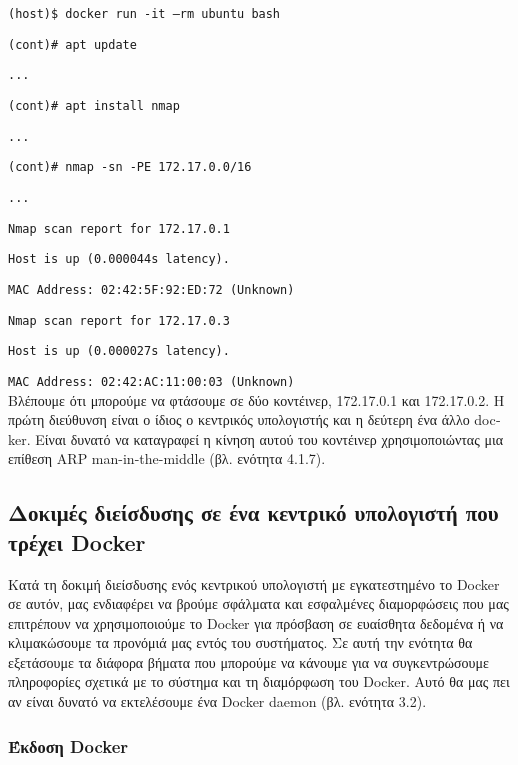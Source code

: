 \texttt{\textlatin{(host)\$ docker run -it --rm ubuntu bash}}

\texttt{\textlatin{(cont)\# apt update}}

\texttt{\textlatin{...}}

\texttt{\textlatin{(cont)\# apt install nmap}}

\texttt{\textlatin{...}}

\texttt{\textlatin{(cont)\# nmap -sn -PE 172.17.0.0/16}}

\texttt{\textlatin{...}}

\texttt{\textlatin{Nmap scan report for 172.17.0.1}}

\texttt{\textlatin{Host is up (0.000044s latency).}}

\texttt{\textlatin{MAC Address: 02:42:5F:92:ED:72 (Unknown)}}

\texttt{\textlatin{Nmap scan report for 172.17.0.3}}
 
\texttt{\textlatin{Host is up (0.000027s latency).}}

\texttt{\textlatin{MAC Address: 02:42:AC:11:00:03 (Unknown)}} \\

Βλέπουμε ότι μπορούμε να φτάσουμε σε δύο κοντέινερ, 172.17.0.1 και 172.17.0.2.
Η πρώτη διεύθυνση είναι ο ίδιος ο κεντρικός υπολογιστής και η δεύτερη ένα άλλο
\textlatin{docker}. Είναι δυνατό να καταγραφεί η κίνηση αυτού του κοντέινερ
χρησιμοποιώντας μια επίθεση \textlatin{ARP man-in-the-middle} (βλ.
ενότητα 4.1.7).

\subsection{Δοκιμές διείσδυσης σε ένα κεντρικό υπολογιστή που τρέχει
\textlatin{Docker}}

Κατά τη δοκιμή διείσδυσης ενός κεντρικού υπολογιστή με εγκατεστημένο το
\textlatin{Docker} σε αυτόν, μας ενδιαφέρει να βρούμε σφάλματα και εσφαλμένες
διαμορφώσεις που μας επιτρέπουν να χρησιμοποιούμε το \textlatin{Docker} για
πρόσβαση σε ευαίσθητα δεδομένα ή να κλιμακώσουμε τα προνόμιά μας εντός του
συστήματος. Σε αυτή την ενότητα θα εξετάσουμε τα διάφορα βήματα που μπορούμε να
κάνουμε για να συγκεντρώσουμε πληροφορίες σχετικά με το σύστημα και τη
διαμόρφωση του \textlatin{Docker}. Αυτό θα μας πει αν είναι δυνατό να
εκτελέσουμε ένα \textlatin{Docker daemon} (βλ. ενότητα 3.2).

\subsubsection{Έκδοση \textlatin{Docker}}

